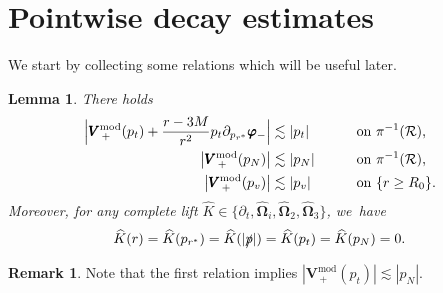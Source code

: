 \documentclass[JEP,XML,SOM,Unicode,published]{cedram}
\theoremstyle{plain}
\newtheorem{lemma}[proposition]{Lemma}
\theoremstyle{definition}
\newtheorem{remark}[proposition]{Remark}
\begin{document}
\section{Pointwise decay estimates}\label{Sec8}

We start by collecting some relations which will be useful later.

\begin{lemma}\label{identityVplusp}
There holds
\begin{alignat*}{2}
\Bigl|\pmb{V}_{\, +}^{ \mathrm{mod}} (p_t)+\frac{r-3M}{r^2}p_t\partial_{p_{r^*}} \pmb{\varphi}_-\Bigr| & \lesssim |p_t| \qquad &&\text{on $\pi^{-1}(\mathcal{R})$,} \\
\big| \pmb{V}_{\, +}^{ \mathrm{mod}} (p_N) \big| & \lesssim |p_N| \qquad &&\text{on $\pi^{-1}(\mathcal{R})$,} \\
\big| \pmb{V}_{\, +}^{ \mathrm{mod}} (p_v) \big| & \lesssim |p_v| \qquad &&\text{on $\{ r \geq R_0 \}$}.
\end{alignat*}
Moreover, for any complete lift $ \widehat{K} \in \{\partial_t, \widehat{\mathbf{\Omega}}_i,\widehat{\mathbf{\Omega}}_2,\widehat{\mathbf{\Omega}}_3 \}$, we~have
\[
\widehat{K}(r)= \widehat{K}(p_{r^*}) = \widehat{K}(|\slashed{p}|) = \widehat{K}(p_t) = \widehat{K}(p_N)=0.
\]
\end{lemma}
\begin{remark}\label{Rkpnpt}
Note that the first relation implies $|\pmb{V}_{\, +}^{ \mathrm{mod}} (p_t)| \lesssim |p_N|$.
\end{remark}
\end{document}
